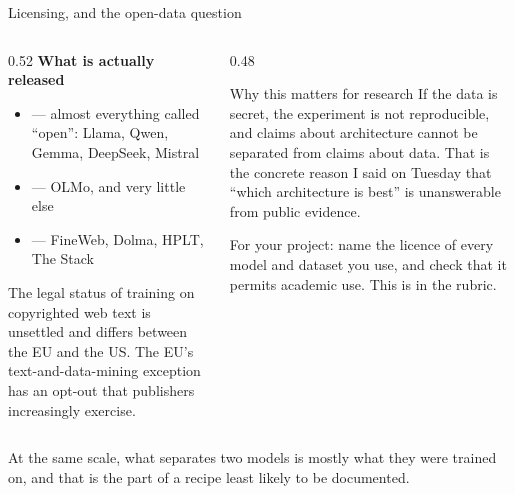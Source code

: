 \documentclass[aspectratio=169,10pt]{beamer}
\begin{document}
\begin{frame}[shrink=11]{Licensing, and the open-data question}
  \begin{columns}[T]
    \begin{column}{0.52\textwidth}
      \textbf{What is actually released}
      \begin{itemize}
        \item {} --- almost everything called ``open'':
          Llama, Qwen, Gemma, DeepSeek, Mistral
        \item {} --- OLMo, and very little else
        \item {} --- FineWeb, Dolma, HPLT, The Stack
      \end{itemize}
      \vspace{0.5em}
      The legal status of training on copyrighted web text is unsettled and
      differs between the EU and the US. The EU's text-and-data-mining exception
      has an opt-out that publishers increasingly exercise.
    \end{column}
    \begin{column}{0.48\textwidth}
      \begin{block}{Why this matters for research}
        \small
        If the data is secret, the experiment is not reproducible, and claims
        about architecture cannot be separated from claims about data.
        \vspace{0.4em}
        That is the concrete reason I said on Tuesday that ``which architecture
        is best'' is unanswerable from public evidence.
      \end{block}
      \vspace{0.3em}
      \small
      For your project: name the licence of every model and dataset you use, and
      check that it permits academic use. This is in the rubric.
    \end{column}
  \end{columns}
  \vfill
  \begin{takeaway}
    At the same scale, what separates two models is mostly what they were
    trained on, and that is the part of a recipe least likely to be documented.
  \end{takeaway}
\end{frame}
\end{document}
